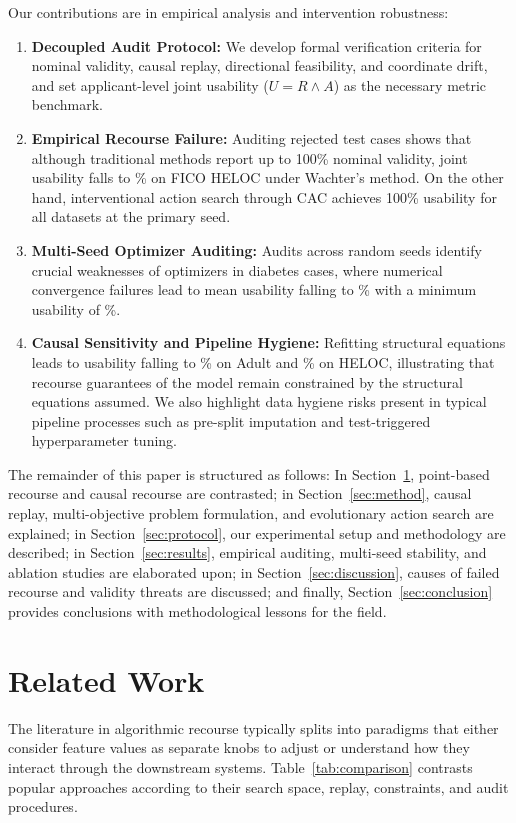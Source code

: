 \documentclass[nolineno]{paper/ieee-access/ieeeaccess}%
\newcommand{\CAC}{CAC}
\begin{document}
Our contributions are in empirical analysis and intervention robustness:
\begin{enumerate}
\item \textbf{Decoupled Audit Protocol:} We develop formal verification criteria for nominal validity, causal replay, directional feasibility, and coordinate drift, and set applicant-level joint usability ($U=R \land A$) as the necessary metric benchmark.
\item \textbf{Empirical Recourse Failure:} Auditing \TotalApplicants{} rejected test cases shows that although traditional methods report up to 100\% nominal validity, joint usability falls to \HelocWachterUsable\% on FICO HELOC under Wachter's method. On the other hand, interventional action search through \CAC{} achieves 100\% usability for all datasets at the primary seed.
\item \textbf{Multi-Seed Optimizer Auditing:} Audits across \CacSeeds{} random seeds identify crucial weaknesses of optimizers in diabetes cases, where numerical convergence failures lead to mean usability falling to \DiabetesCacSeedMean\% with a minimum usability of \DiabetesCacSeedMin\%.
\item \textbf{Causal Sensitivity and Pipeline Hygiene:} Refitting structural equations leads to usability falling to \AdultRefitUsable\% on Adult and \HelocRefitUsable\% on HELOC, illustrating that recourse guarantees of the model remain constrained by the structural equations assumed. We also highlight data hygiene risks present in typical pipeline processes such as pre-split imputation and test-triggered hyperparameter tuning.
\end{enumerate}

The remainder of this paper is structured as follows: In Section~\ref{sec:related}, point-based recourse and causal recourse are contrasted; in Section~\ref{sec:method}, causal replay, multi-objective problem formulation, and evolutionary action search are explained; in Section~\ref{sec:protocol}, our experimental setup and methodology are described; in Section~\ref{sec:results}, empirical auditing, multi-seed stability, and ablation studies are elaborated upon; in Section~\ref{sec:discussion}, causes of failed recourse and validity threats are discussed; and finally, Section~\ref{sec:conclusion} provides conclusions with methodological lessons for the field.

\section{Related Work}
\label{sec:related}
The literature in algorithmic recourse typically splits into paradigms that either consider feature values as separate knobs to adjust or understand how they interact through the downstream systems. Table~\ref{tab:comparison} contrasts popular approaches according to their search space, replay, constraints, and audit procedures.
\end{document}
